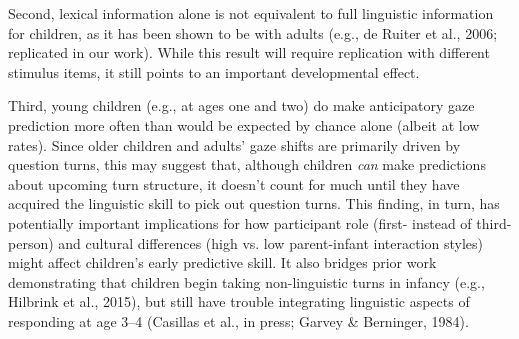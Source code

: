 \documentclass[11pt,a4paper]{letter} %
\begin{document}
\begin{letter}{}
Second, lexical information alone is not equivalent to full linguistic information for children, as it has been shown to be with adults (e.g., de Ruiter et al., 2006; replicated in our work). While this result will require replication with different stimulus items, it still points to an important developmental effect. 

Third, young children (e.g., at ages one and two) do make anticipatory gaze prediction more often than would be expected by chance alone (albeit at low rates). Since older children and adults' gaze shifts are primarily driven by question turns, this may suggest that, although children \textit{can} make predictions about upcoming turn structure, it doesn't count for much until they have acquired the linguistic skill to pick out question turns. This finding, in turn, has potentially important implications for how participant role (first- instead of third-person) and cultural differences (high vs. low parent-infant interaction styles) might affect children's early predictive skill. It also bridges prior work demonstrating that children begin taking non-linguistic turns in infancy (e.g., Hilbrink et al., 2015), but still have trouble integrating linguistic aspects of responding at age 3--4 (Casillas et al., in press; Garvey \& Berninger, 1984).




\end{letter}
\end{document}
